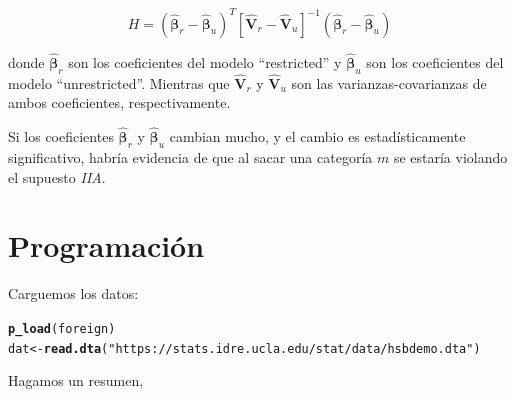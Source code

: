 \documentclass[onesided]{article}\usepackage[]{graphicx}\usepackage[]{color}
\makeatletter
\newcommand{\hlstr}[1]{\textcolor[rgb]{0.192,0.494,0.8}{#1}}%
\newcommand{\hlstd}[1]{\textcolor[rgb]{0.345,0.345,0.345}{#1}}%
\newcommand{\hlkwb}[1]{\textcolor[rgb]{0.69,0.353,0.396}{#1}}%
\newcommand{\hlkwd}[1]{\textcolor[rgb]{0.737,0.353,0.396}{\textbf{#1}}}%
\newenvironment{kframe}{%
 \def\at@end@of@kframe{}%
 \ifinner\ifhmode%
  \def\at@end@of@kframe{\end{minipage}}%
  \begin{minipage}{\columnwidth}%
 \fi\fi%
 \def\FrameCommand##1{\hskip\@totalleftmargin \hskip-\fboxsep
 \colorbox{shadecolor}{##1}\hskip-\fboxsep
     \hskip-\linewidth \hskip-\@totalleftmargin \hskip\columnwidth}%
 \MakeFramed {\advance\hsize-\width
   \@totalleftmargin\z@ \linewidth\hsize
   \@setminipage}}%
 {\par\unskip\endMakeFramed%
 \at@end@of@kframe}
\newenvironment{knitrout}{}{} %
\makeatother
\begin{document}
\begin{equation}\label{Hausman.McFadden}
H = (\boldsymbol{\hat\beta}_{r} - \boldsymbol{\hat\beta}_{u})^{T}[\boldsymbol{\hat V}_{r}-\boldsymbol{\hat V}_{u}]^{-1}(\boldsymbol{\hat\beta}_{r} - \boldsymbol{\hat\beta}_{u})
\end{equation}

donde $\boldsymbol{\hat\beta}_{r}$ son los coeficientes del modelo ``restricted'' y $\boldsymbol{\hat\beta}_{u}$ son los coeficientes del modelo ``unrestricted''. Mientras que $\boldsymbol{\hat V}_{r}$ y $\boldsymbol{\hat V}_{u}$ son las varianzas-covarianzas de ambos coeficientes, respectivamente. 

Si los coeficientes $\boldsymbol{\hat\beta}_{r}$ y $\boldsymbol{\hat\beta}_{u}$ cambian mucho, y el cambio es estad\'isticamente significativo, habr\'ia evidencia de que al sacar una categor\'ia $m$ se estar\'ia violando el supuesto \emph{IIA}.

\section{Programaci\'on}

Carguemos los datos:

\begin{knitrout}
\color{fgcolor}\begin{kframe}
\begin{alltt}
\hlkwd{p_load}\hlstd{(foreign)}
\hlstd{dat} \hlkwb{<-} \hlkwd{read.dta}\hlstd{(}\hlstr{"https://stats.idre.ucla.edu/stat/data/hsbdemo.dta"}\hlstd{)}
\end{alltt}
\end{kframe}
\end{knitrout}

Hagamos un resumen,
\end{document}
